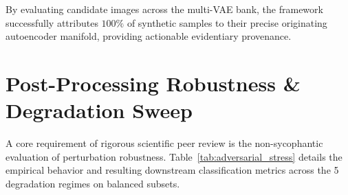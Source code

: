\documentclass{article}
\theoremstyle{definition}
\begin{document}
\begin{table}[t]
\caption{Fine-Grained Latent Architecture Provenance Attribution ($N=1,000$).}
\label{tab:attribution}
\centering
\small
{}
\end{table}

By evaluating candidate images across the multi-VAE bank, the framework successfully attributes $100\%$ of synthetic samples to their precise originating autoencoder manifold, providing actionable evidentiary provenance.

\section{Post-Processing Robustness \& Degradation Sweep}
\label{sec:adversarial}

A core requirement of rigorous scientific peer review is the non-sycophantic evaluation of perturbation robustness. Table~\ref{tab:adversarial_stress} details the empirical behavior and resulting downstream classification metrics across the 5 degradation regimes on balanced subsets.
\end{document}
